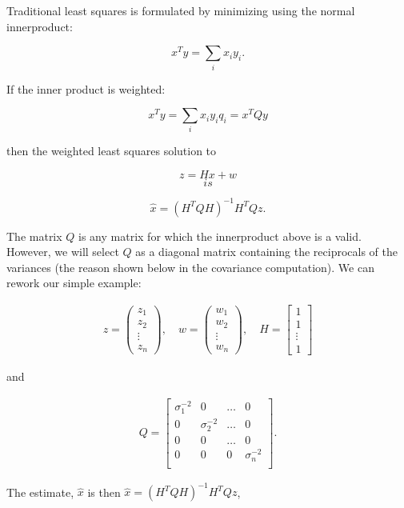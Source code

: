 Traditional least squares is formulated by minimizing using the normal
innerproduct:

\[x^Ty = \sum_i x_iy_i.\]

If the inner product is weighted:

\[x^Ty = \sum_i x_i y_i q_i = x^T Q y\]

then the weighted least squares solution to

\[z = Hx + w\]\[is\]

\[\hat{x} = \left(H^T Q H\right)^{-1} H^TQz .\]

The matrix \(Q\) is any matrix for which the innerproduct above is a
valid. However, we will select \(Q\) as a diagonal matrix containing the
reciprocals of the variances (the reason shown below in the covariance
computation). We can rework our simple example:

\[\begin{aligned}
z = \begin{pmatrix} z_1 \\ z_2 \\ \vdots \\ z_n \end{pmatrix},  \quad w = \begin{pmatrix} w_1 \\ w_2 \\ \vdots \\ w_n \end{pmatrix}, \quad
H = \begin{bmatrix} 1 \\ 1 \\ \vdots \\ 1 \end{bmatrix}
\end{aligned}\]

and

\[\begin{aligned}
Q =
\begin{bmatrix}
\sigma_1^{-2} & 0 & \dots & 0 \\
0 & \sigma_2^{-2} &  \dots & 0  \\
0 & 0 &  \dots & 0  \\
0 & 0 & 0 &\sigma_n^{-2}  \\
\end{bmatrix}.
\end{aligned}\]

The estimate, \(\hat{x}\) is then
\(\hat{x} = \left(H^TQH\right)^{-1} H^T Q z\),

